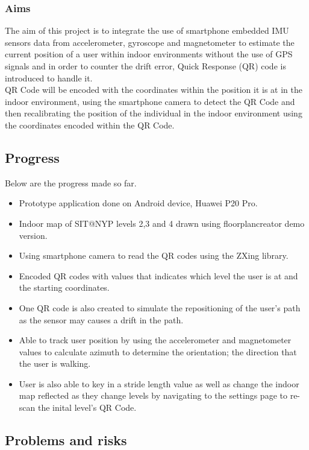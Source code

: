 \documentclass[11pt]{article}
\begin{document}
\subsubsection{Aims}\label{aims}

The aim of this project is to integrate the use of smartphone embedded IMU sensors data from accelerometer, gyroscope and magnetometer to estimate the current position of a user within indoor environments without the use of GPS signals and in order to counter the drift error, Quick Response (QR) code is introduced to handle it.\\

QR Code will be encoded with the coordinates within the position it is at in the indoor environment, using the smartphone camera to detect the QR Code and then recalibrating the position of the individual in the indoor environment using the coordinates encoded within the QR Code.
\subsection{Progress}\label{progress}
Below are the progress made so far.
\begin{itemize}
  \item Prototype application done on Android device, Huawei P20 Pro.
  \item Indoor map of SIT@NYP levels 2,3 and 4 drawn using floorplancreator demo version.
  \item Using smartphone camera to read the QR codes using the ZXing library.
  \item Encoded QR codes with values that indicates which level the user is at and the starting coordinates.
  \item One QR code is also created to simulate the repositioning of the user's path as the sensor may causes a drift in the path.
  \item Able to track user position by using the accelerometer and magnetometer values to calculate azimuth to determine the orientation; the direction that the user is walking.
  \item User is also able to key in a stride length value as well as change the indoor map reflected as they change levels by navigating to the settings page to re-scan the inital level's QR Code.
\end{itemize}

\subsection{Problems and risks}\label{problems-and-risks}
\end{document}
